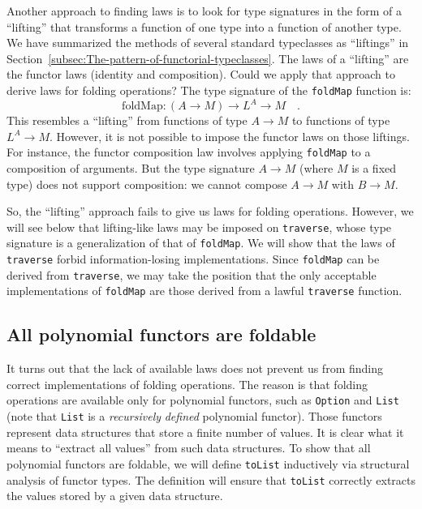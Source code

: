 Another approach to finding laws is to look for type signatures in
the form of a \textsf{``}lifting\textsf{''} that transforms a function of one type
into a function of another type. We have summarized the methods of
several standard typeclasses as \textsf{``}liftings\textsf{''} in Section~\ref{subsec:The-pattern-of-functorial-typeclasses}.
The laws of a \textsf{``}lifting\textsf{''} are the functor laws (identity and composition).
Could we apply that approach to derive laws for folding operations?
The type signature of the \lstinline!foldMap! function is:
\[
\text{foldMap}:\left(A\rightarrow M\right)\rightarrow L^{A}\rightarrow M\quad.
\]
This resembles a \textsf{``}lifting\textsf{''} from functions of type $A\rightarrow M$
to functions of type $L^{A}\rightarrow M$. However, it is not possible
to impose the functor laws on those liftings. For instance, the functor
composition law involves applying \lstinline!foldMap! to a composition
of arguments. But the type signature $A\rightarrow M$ (where $M$
is a fixed type) does not support composition: we cannot compose $A\rightarrow M$
with $B\rightarrow M$.

So, the \textsf{``}lifting\textsf{''} approach fails to give us laws for folding operations.
However, we will see below that lifting-like laws may be imposed on
\lstinline!traverse!, whose type signature is a generalization of
that of \lstinline!foldMap!. We will show that the laws of \lstinline!traverse!
forbid information-losing implementations. Since \lstinline!foldMap!
can be derived from \lstinline!traverse!, we may take the position
that the only acceptable implementations of \lstinline!foldMap! are
those derived from a lawful \lstinline!traverse! function.

\subsection{All polynomial functors are foldable\label{subsec:All-polynomial-functors-are-foldable}}

It turns out that the lack of available laws does not prevent us from
finding correct implementations of folding operations. The reason
is that folding operations are available only for polynomial functors,
such as \lstinline!Option! and \lstinline!List! (note that \lstinline!List!
is a \emph{recursively} \emph{defined} polynomial functor).
Those functors represent data structures that store a finite number
of values. It is clear what it means to \textsf{``}extract all values\textsf{''} from
such data structures. To show that all polynomial functors are foldable,
we will define \lstinline!toList! inductively via structural analysis
of functor types. The definition will ensure that \lstinline!toList!
correctly extracts the values stored by a given data structure.

